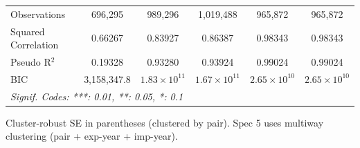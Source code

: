 \begin{table}[htbp]
\begin{tabular}{lccccc}
      Observations        & 696,295        & 989,296               & 1,019,488             & 965,872               & 965,872\\  
      Squared Correlation & 0.66267        & 0.83927               & 0.86387               & 0.98343               & 0.98343\\  
      Pseudo R$^2$        & 0.19328        & 0.93280               & 0.93924               & 0.99024               & 0.99024\\  
      BIC                 & 3,158,347.8    & $1.83\times 10^{11}$  & $1.67\times 10^{11}$  & $2.65\times 10^{10}$  & $2.65\times 10^{10}$\\   
      \midrule \midrule
      \multicolumn{6}{l}{\emph{Signif. Codes: ***: 0.01, **: 0.05, *: 0.1}}\\
   \end{tabular}
   
   \par \raggedright 
   Cluster-robust SE in parentheses (clustered by pair). Spec 5 uses multiway clustering (pair + exp-year + imp-year).
\end{table}


